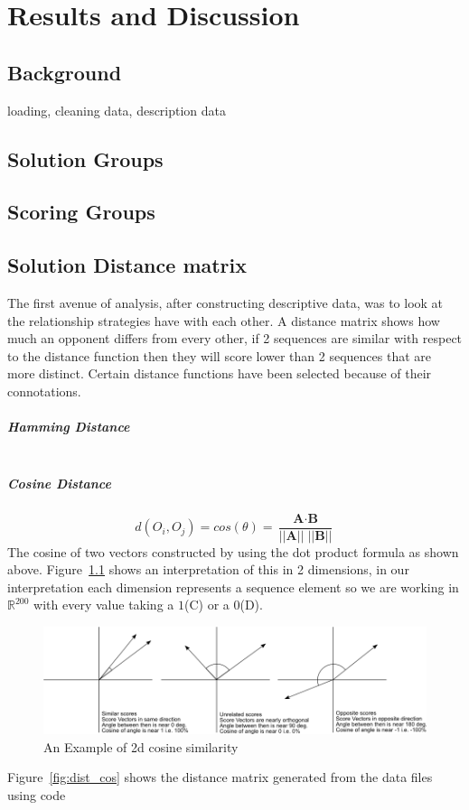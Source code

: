 \chapter{Results and Discussion}\label{ch:results}
\section{Background}
loading, cleaning data, description data

\section{Solution Groups}

\section{Scoring Groups}

\section{Solution Distance matrix}
The first avenue of analysis, after constructing descriptive data, was to look at the relationship strategies have with each other.
A distance matrix shows how much an opponent differs from every other, if 2 sequences are similar with respect to the distance function then they will score lower than 2 sequences that are more distinct.
Certain distance functions have been selected because of their connotations.

\paragraph{Hamming Distance}
$$$$

\paragraph{Cosine Distance}
$$ d(O_i,O_j) = cos(\theta) = \frac{\textbf{A} \cdot \textbf{B}}{|| \textbf{A} || \; || \textbf{B} ||} $$
The cosine of two vectors constructed by using the dot product formula as shown above.
Figure~\ref{fig:cosine} shows an interpretation of this in 2 dimensions, in our interpretation each dimension represents a sequence element so we are working in $\mathbb{R}^{200}$ with every value taking a $1$(C) or a $0$(D).
\begin{figure}[h]
    \includegraphics[width=1.0\textwidth, center]{./img/examples/cosinesimilarity.png}
    \caption{An Example of 2d cosine similarity~\cite{Perone2013blog}}\label{fig:cosine}
\end{figure}
Figure~\ref{fig:dist_cos} shows the distance matrix generated from the data files using code 




